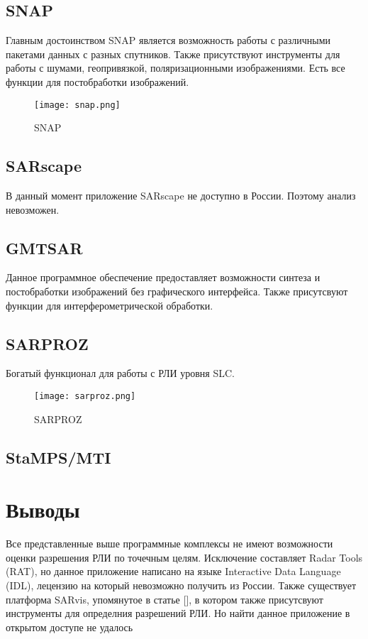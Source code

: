 \subsection{SNAP}
	Главным достоинством SNAP является возможность работы с различными пакетами данных с разных спутников. Также присутствуют инструменты для работы с шумами, геопривязкой, поляризационными изображениями. Есть все функции для постобработки изображений.\\
	
	
\begin{figure}[ht]
    \centering
    \texttt{[image: snap.png]}
    \caption{SNAP}
    \label{fig:snap}
\end{figure}

	
\subsection{SARscape}
	В данный момент приложение SARscape не доступно в России. Поэтому анализ невозможен.\\
	
\subsection{GMTSAR}		
	Данное программное обеспечение предоставляет возможности синтеза и постобработки изображений без графического интерфейса. Также присутсвуют функции для интерферометрической обработки.\\
	
\subsection{SARPROZ}
	Богатый функционал для работы с РЛИ уровня SLC.\\	

\begin{figure}[ht]
    \centering
    \texttt{[image: sarproz.png]}
    \caption{SARPROZ}
    \label{fig:sarproz}
\end{figure}
	
\subsection{StaMPS/MTI}

\section{Выводы}

	Все представленные выше программные комплексы не имеют возможности оценки разрешения РЛИ по точечным целям. Исключение составляет Radar Tools (RAT), но данное приложение написано на языке Interactive Data Language (IDL), лецензию на который невозможно получить из России. Также существует платформа SARvis, упомянутое в статье [], в котором также присутсвуют инструменты для определния разрешений РЛИ. Но найти данное приложение в открытом доступе не удалось
	
\newpage

